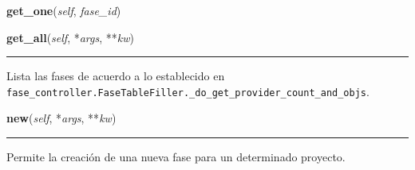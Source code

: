 \hspace{.8\funcindent}\begin{boxedminipage}{\funcwidth}

    \raggedright \textbf{get\_one}(\textit{self}, \textit{fase\_id})

\setlength{\parskip}{2ex}
\setlength{\parskip}{1ex}
    \end{boxedminipage}

    \label{saip:controllers:fase_controller:FaseController:get_all}

    \vspace{0.5ex}

\hspace{.8\funcindent}\begin{boxedminipage}{\funcwidth}

    \raggedright \textbf{get\_all}(\textit{self}, *\textit{args}, **\textit{kw})

    \vspace{-1.5ex}

    \rule{\textwidth}{0.5\fboxrule}
\setlength{\parskip}{2ex}
    Lista las fases de acuerdo a lo establecido en 
    \texttt{fase\_controller.FaseTableFiller.\_do\_get\_provider\_count\_and\_objs}.

\setlength{\parskip}{1ex}
    \end{boxedminipage}

    \label{saip:controllers:fase_controller:FaseController:new}

    \vspace{0.5ex}

\hspace{.8\funcindent}\begin{boxedminipage}{\funcwidth}

    \raggedright \textbf{new}(\textit{self}, *\textit{args}, **\textit{kw})

    \vspace{-1.5ex}

    \rule{\textwidth}{0.5\fboxrule}
\setlength{\parskip}{2ex}
    Permite la creación de una nueva fase para un determinado proyecto.

\setlength{\parskip}{1ex}
    \end{boxedminipage}

